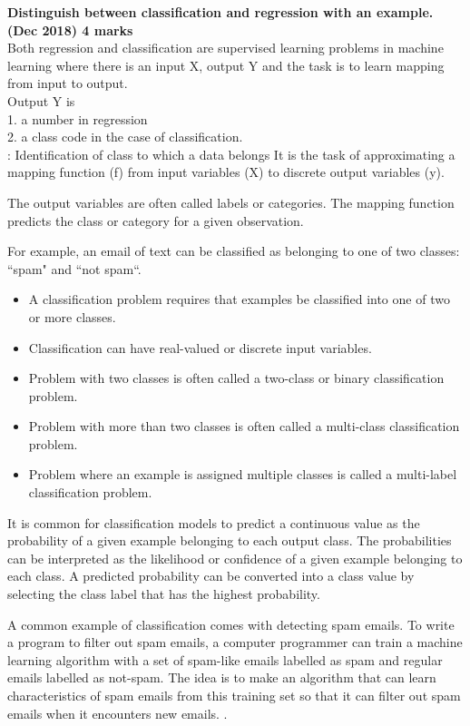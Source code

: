 \textbf{\textcolor{LightMagenta}{Distinguish between classification and regression with an example. (Dec 2018) \hfill 4 marks}} \\[5pt]
Both regression and classification are supervised learning problems in machine learning where there is an input X, output Y and the task is to learn mapping from input to output.\\
Output Y is \\
    \hspace*{10pt} 1. a number in regression \\
    \hspace*{10pt} 2. a class code in the case of classification. \\
   
\textcolor{purple}{\underline{}}: Identification of class to which a data belongs It is the task of approximating a mapping function (f) from input variables (X) to discrete output variables (y).

The output variables are often called labels or categories. The mapping function predicts the class or category for a given observation.

For example, an email of text can be classified as belonging to one of two classes: “spam" and “not spam“.
\begin{itemize}
    \item A classification problem requires that examples be classified into one of two or more classes.
\item Classification can have real-valued or discrete input variables.
\item Problem with two classes is often called a two-class or binary classification problem.
\item Problem with more than two classes is often called a multi-class classification problem.
\item Problem where an example is assigned multiple classes is called a multi-label classification problem.
\end{itemize}
It is common for classification models to predict a continuous value as the probability of a given example belonging to each output class. The probabilities can be interpreted as the likelihood or confidence of a given example belonging to each class. A predicted probability can be converted into a class value by selecting the class label that has the highest probability.

A common example of classification comes with detecting spam emails. To write a program to filter out spam emails, a computer programmer can train a machine learning algorithm with a set of spam-like emails labelled as spam and regular emails labelled as not-spam. The idea is to make an algorithm that can learn characteristics of spam emails from this training set so that it can filter out spam emails when it encounters new emails. .


